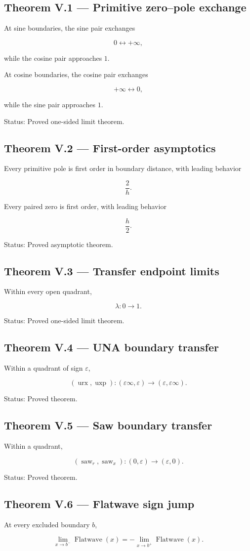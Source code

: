 \documentclass[11pt,oneside,openany]{book}
\newcommand{\PCsubsection}[1]{%
  \subsection*{#1}%
}
\begin{document}
\PCsubsection{Theorem V.1 --- Primitive zero–pole exchange}

At sine boundaries, the sine pair exchanges

\[
0 \longleftrightarrow +\infty,
\]

while the cosine pair approaches \(1\).

At cosine boundaries, the cosine pair exchanges

\[
+\infty \longleftrightarrow 0,
\]

while the sine pair approaches \(1\).

Status: Proved one-sided limit theorem.

\PCsubsection{Theorem V.2 --- First-order asymptotics}

Every primitive pole is first order in boundary distance, with leading behavior

\[
\frac2h.
\]

Every paired zero is first order, with leading behavior

\[
\frac h2.
\]

Status: Proved asymptotic theorem.

\PCsubsection{Theorem V.3 --- Transfer endpoint limits}

Within every open quadrant,

\[
\boxed{ \lambda:0\longrightarrow1. }
\]

Status: Proved one-sided limit theorem.

\PCsubsection{Theorem V.4 --- UNA boundary transfer}

Within a quadrant of sign \(\varepsilon\),

\[
(\operatorname{urx},\operatorname{uxp}) : (\varepsilon\infty,\varepsilon) \longrightarrow (\varepsilon,\varepsilon\infty).
\]

Status: Proved theorem.

\PCsubsection{Theorem V.5 --- Saw boundary transfer}

Within a quadrant,

\[
\boxed{ (\operatorname{saw}_{r},\operatorname{saw}_{x}) : (0,\varepsilon) \longrightarrow (\varepsilon,0). }
\]

Status: Proved theorem.

\PCsubsection{Theorem V.6 --- Flatwave sign jump}

At every excluded boundary \(b\),

\[
\boxed{ \lim_{x\to b^-}\operatorname{Flatwave}(x) = - \lim_{x\to b^+}\operatorname{Flatwave}(x) }.
\]
\end{document}
